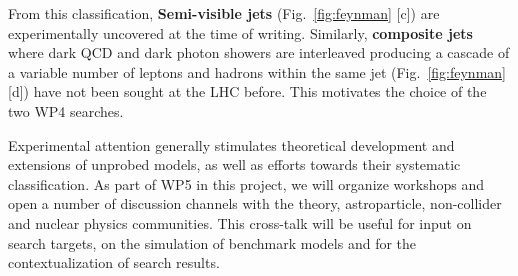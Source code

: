 From this classification, \textbf{Semi-visible jets}  (Fig.~\ref{fig:feynman} [c]) are experimentally uncovered at the time of writing. 
Similarly, \textbf{composite jets} where dark QCD and dark photon showers are interleaved producing a cascade of a variable number of leptons and hadrons within the same jet (Fig.~\ref{fig:feynman} [d]) have not been sought at the LHC before. 
This motivates the choice of the two WP4 searches. 

Experimental attention generally stimulates theoretical development and extensions of unprobed models, as well as efforts towards their systematic classification. 
As part of WP5 in this project, we will organize workshops and open a number of discussion channels with the theory, astroparticle, non-collider and nuclear physics communities. 
This cross-talk will be useful for input on search targets, on the simulation of benchmark models and for the contextualization of search results.
